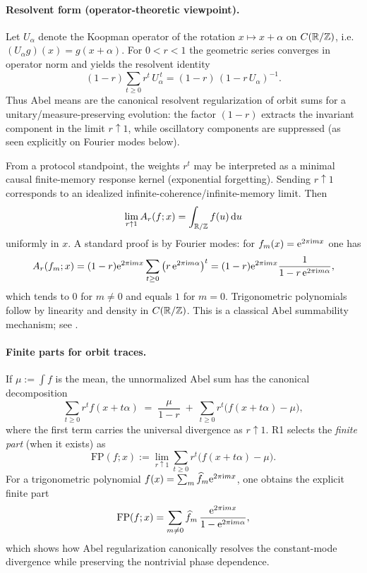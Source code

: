 \paragraph{Resolvent form (operator-theoretic viewpoint).}
Let $U_\alpha$ denote the Koopman operator of the rotation $x\mapsto x+\alpha$ on $C(\mathbb{R}/\mathbb{Z})$, i.e.\ $(U_\alpha g)(x)=g(x+\alpha)$. For $0<r<1$ the geometric series converges in operator norm and yields the resolvent identity
\begin{equation}
(1-r)\sum_{t\ge 0} r^t\,U_\alpha^{\,t}
=(1-r)\,(1-r\,U_\alpha)^{-1}.
\label{eq:abel_resolvent}
\end{equation}
Thus Abel means are the canonical resolvent regularization of orbit sums for a unitary/measure-preserving evolution: the factor $(1-r)$ extracts the invariant component in the limit $r\uparrow 1$, while oscillatory components are suppressed (as seen explicitly on Fourier modes below).
\par
From a protocol standpoint, the weights $r^t$ may be interpreted as a minimal causal finite-memory response kernel (exponential forgetting). Sending $r\uparrow 1$ corresponds to an idealized infinite-coherence/infinite-memory limit.
Then
\begin{equation}
\lim_{r\uparrow 1} A_r(f;x)=\int_{\mathbb{R}/\mathbb{Z}} f(u)\,\mathrm{d} u
\end{equation}
uniformly in $x$. A standard proof is by Fourier modes: for $f_m(x)=\mathrm{e}^{2\pi\mathrm{i} m x}$ one has
\begin{equation}
A_r(f_m;x)
=(1-r)\mathrm{e}^{2\pi\mathrm{i} m x}\sum_{t\ge 0}\left(r\,\mathrm{e}^{2\pi\mathrm{i} m\alpha}\right)^t
=
(1-r)\mathrm{e}^{2\pi\mathrm{i} m x}\frac{1}{1-r\,\mathrm{e}^{2\pi\mathrm{i} m\alpha}},
\end{equation}
which tends to $0$ for $m\neq 0$ and equals $1$ for $m=0$. Trigonometric polynomials follow by linearity and density in $C(\mathbb{R}/\mathbb{Z})$. This is a classical Abel summability mechanism; see \cite{Hardy1949}.

\paragraph{Finite parts for orbit traces.}
If $\mu:=\int f$ is the mean, the unnormalized Abel sum has the canonical decomposition
\begin{equation}
\sum_{t\ge 0} r^t f(x+t\alpha)
\;=\;
\frac{\mu}{1-r}
\;+\;
\sum_{t\ge 0} r^t\bigl(f(x+t\alpha)-\mu\bigr),
\end{equation}
where the first term carries the universal divergence as $r\uparrow 1$. R1 selects the \emph{finite part} (when it exists) as
\begin{equation}
\mathrm{FP}(f;x)
:=
\lim_{r\uparrow 1}\sum_{t\ge 0} r^t\bigl(f(x+t\alpha)-\mu\bigr).
\end{equation}
For a trigonometric polynomial $f(x)=\sum_m \widehat f_m \mathrm{e}^{2\pi\mathrm{i} m x}$, one obtains the explicit finite part
\begin{equation}
\mathrm{FP}(f;x)
=
\sum_{m\neq 0}\widehat f_m\,\frac{\mathrm{e}^{2\pi\mathrm{i} m x}}{1-\mathrm{e}^{2\pi\mathrm{i} m\alpha}},
\end{equation}
which shows how Abel regularization canonically resolves the constant-mode divergence while preserving the nontrivial phase dependence.


